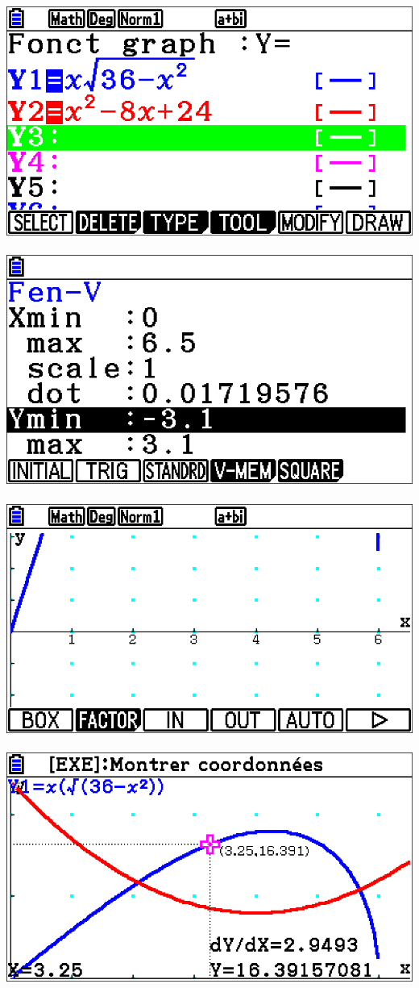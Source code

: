 \documentclass[a4paper,11pt]{article}
\begin{document}
\begin{enumerate}
\begin{center}
		\includegraphics[height=\htimg]{tp01_corr_situ2_a}~~\includegraphics[height=\htimg]{tp01_corr_situ2_b}~~\includegraphics[height=\htimg]{tp01_corr_situ2_c}~~\includegraphics[height=\htimg]{tp01_corr_situ2_d}

\end{center}
\end{enumerate}
\end{document}
